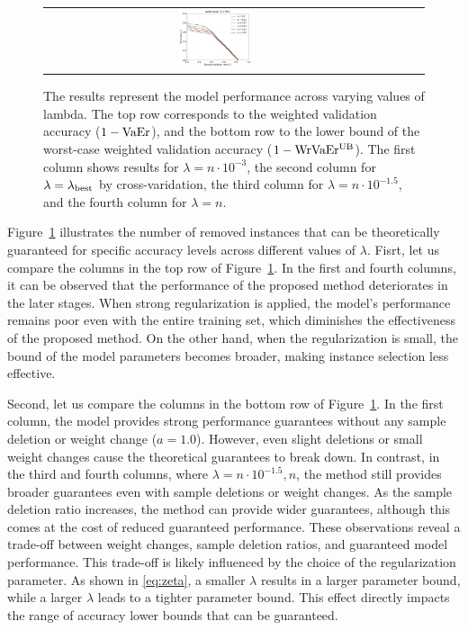 \begin{figure}[tb]
\begin{center}
\begin{tabular}{cccc}
				\includegraphics[width=0.22\textwidth]{fig/table_logistic/australian-logistic/kernel/kernel_ss_screening_rate_lam552_x_n_y_etest.pdf}
			\end{tabular}
		\end{center}
		\caption{The results represent the model performance across varying values of lambda. The top row corresponds to the
		weighted validation accuracy ($1-{\rm VaEr}$), and the bottom row to the lower bound of the worst-case weighted validation accuracy ($1-{\rm WrVaEr^{\rm UB}}$). The first column shows results for \(\lambda = n \cdot 10^{-3}\), the second column for \(\lambda = \lambda_{\rm best}\) by cross-varidation, the third column for \(\lambda = n \cdot 10^{-1.5}\), and the fourth column for \(\lambda = n\).}
		\label{fig:guarantee}
	\end{figure}

	Figure~\ref{fig:guarantee} illustrates the number of removed instances that can be theoretically guaranteed for specific accuracy levels across different values of $\lambda$.  
	Fisrt, let us compare the columns in the top row of Figure~\ref{fig:guarantee}.  
	In the first and fourth columns, it can be observed that the performance of the proposed method deteriorates in the later stages.
	When strong regularization is applied, the model's performance remains poor even with the entire training set, which diminishes the effectiveness of the proposed method.
	On the other hand, when the regularization is small, the bound of the model parameters becomes broader, making instance selection less effective.

	Second, let us compare the columns in the bottom row of Figure~\ref{fig:guarantee}.
	In the first column, the model provides strong performance guarantees without any sample deletion or weight change (\(a = 1.0\)).
	However, even slight deletions or small weight changes cause the theoretical guarantees to break down.
	In contrast, in the third and fourth columns, where \(\lambda = n \cdot 10^{-1.5}, n\), the method still provides broader guarantees even with sample deletions or weight changes.
	As the sample deletion ratio increases, the method can provide wider guarantees, although this comes at the cost of reduced guaranteed performance.
	These observations reveal a trade-off between weight changes, sample deletion ratios, and guaranteed model performance.  
	This trade-off is likely influenced by the choice of the regularization parameter.  
	As shown in \eqref{eq:zeta}, a smaller $\lambda$ results in a larger parameter bound, while a larger $\lambda$ leads to a tighter parameter bound.  
	This effect directly impacts the range of accuracy lower bounds that can be guaranteed.